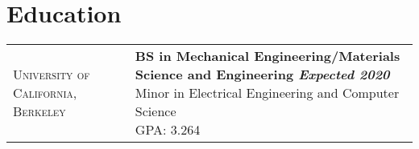 \documentclass[letterpaper, 10pt]{article}
\begin{document}
\begin{flushleft}
\begin{tabular}{>{\raggedright}p{1.3in} @{\hskip .2in} l}


  \end{tabular}
\end{flushleft}
\section{Education}
\begin{flushleft}
  \begin{tabular}{>{\raggedright}p{1.3in}  @{\hskip .2in} l}
      \textsc{University of California, Berkeley}   & \parbox[t]{5.75in}{\textbf{BS in Mechanical Engineering/Materials Science and Engineering \hfill\textit{Expected 2020}} \smallskip \\ Minor in Electrical Engineering and Computer Science\\ GPA: 3.264
       } \\


  \end{tabular}
\end{flushleft}

\end{document}
